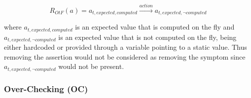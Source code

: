 \begin{itemize}
    \begin{equation*}
        R_{OtF}(a) =  a_{t, expected, computed} \xrightarrow{action} a_{t, expected, \neg computed}
    \end{equation*}
    
    where $a_{t, expected, computed}$ is an expected value that is computed on the fly and $a_{t, expected, \neg computed}$ is an expected value that is not computed on the fly, being either hardcoded or provided through a variable pointing to a static value. Thus removing the assertion would not be considered as removing the symptom since $a_{t, expected, \neg computed}$ would not be present.
\end{itemize}

\subsubsection{Over-Checking (OC)}


